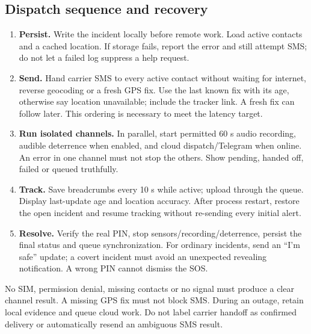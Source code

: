 \subsection{Dispatch sequence and recovery}
\begin{enumerate}
\item \textbf{Persist.} Write the incident locally before remote work. Load active contacts and a cached location. If storage fails, report the error and still attempt SMS; do not let a failed log suppress a help request.
\item \textbf{Send.} Hand carrier SMS to every active contact without waiting for internet, reverse geocoding or a fresh GPS fix. Use the last known fix with its age, otherwise say location unavailable; include the tracker link. A fresh fix can follow later. This ordering is necessary to meet the latency target.
\item \textbf{Run isolated channels.} In parallel, start permitted 60 s audio recording, audible deterrence when enabled, and cloud dispatch/Telegram when online. An error in one channel must not stop the others. Show pending, handed off, failed or queued truthfully.
\item \textbf{Track.} Save breadcrumbs every 10 s while active; upload through the queue. Display last-update age and location accuracy. After process restart, restore the open incident and resume tracking without re-sending every initial alert.
\item \textbf{Resolve.} Verify the real PIN, stop sensors/recording/deterrence, persist the final status and queue synchronization. For ordinary incidents, send an ``I'm safe'' update; a covert incident must avoid an unexpected revealing notification. A wrong PIN cannot dismiss the SOS.
\end{enumerate}

\begin{cautionbox}[title=Failure cases must be visible]
No SIM, permission denial, missing contacts or no signal must produce a clear channel result. A missing GPS fix must not block SMS. During an outage, retain local evidence and queue cloud work. Do not label carrier handoff as confirmed delivery or automatically resend an ambiguous SMS result.
\end{cautionbox}
